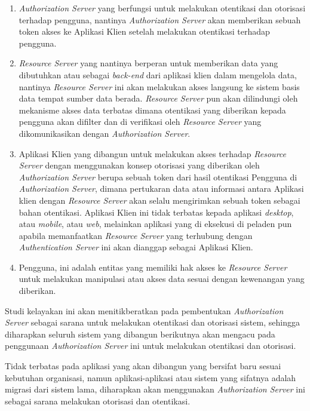 \documentclass[pdftex,12pt, oneside]{article}
\begin{document}
\begin{enumerate}

\item \textit{Authorization Server} yang berfungsi untuk melakukan otentikasi dan otorisasi terhadap pengguna, nantinya \textit{Authorization Server} akan memberikan sebuah token akses ke Aplikasi Klien setelah melakukan otentikasi terhadap pengguna.

\item \textit{Resource Server} yang nantinya berperan untuk memberikan data yang dibutuhkan atau sebagai \textit{back-end} dari aplikasi klien dalam mengelola data, nantinya \textit{Resource Server} ini akan melakukan akses langsung ke sistem basis data tempat sumber data berada. \textit{Resource Server} pun akan dilindungi oleh mekanisme akses data terbatas dimana otentikasi yang diberikan kepada pengguna akan difilter dan di verifikasi oleh \textit{Resource Server} yang dikomunikasikan dengan \textit{Authorization Server}.

\item Aplikasi Klien yang dibangun untuk melakukan akses terhadap  \textit{Resource Server} dengan menggunakan konsep otorisasi yang diberikan oleh \textit{Authorization Server} berupa sebuah token dari hasil otentikasi Pengguna di \textit{Authorization Server}, dimana pertukaran data atau informasi antara Aplikasi klien dengan \textit{Resource Server} akan selalu mengirimkan sebuah token sebagai bahan otentikasi. Aplikasi Klien ini tidak terbatas kepada aplikasi \textit{desktop}, atau \textit{mobile}, atau \textit{web}, melainkan aplikasi yang di eksekusi di peladen pun apabila memanfaatkan \textit{Resource Server} yang terhubung dengan \textit{Authentication Server} ini akan dianggap sebagai Aplikasi Klien.

\item Pengguna, ini adalah entitas yang memiliki hak akses ke \textit{Resource Server} untuk melakukan manipulasi atau akses data sesuai dengan kewenangan yang diberikan.
\end{enumerate}

Studi kelayakan ini akan menitikberatkan pada pembentukan \textit{Authorization Server} sebagai sarana untuk melakukan otentikasi dan otorisasi sistem, sehingga diharapkan seluruh sistem yang dibangun berikutnya akan mengacu pada penggunaan \textit{Authorization Server} ini untuk melakukan otentikasi dan otorisasi.

Tidak terbatas pada aplikasi yang akan dibangun yang bersifat baru sesuai kebutuhan organisasi, namun aplikasi-aplikasi atau sistem yang sifatnya adalah migrasi dari sistem lama, diharapkan akan menggunakan \textit{Authorization Server} ini sebagai sarana melakukan otorisasi dan otentikasi.
\end{document}
